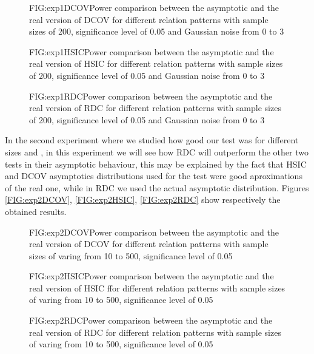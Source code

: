 \begin{figure}[Experiment 1 DCOV asymptotic vs real]{FIG:exp1DCOV}{Power comparison between the asymptotic and the real version of DCOV for different relation patterns with sample sizes of 200, significance level of 0.05 and Gaussian noise from 0 to 3}
\end{figure}
\begin{figure}[Experiment 1 HSIC asymptotic vs real]{FIG:exp1HSIC}{Power comparison between the asymptotic and the real version of HSIC for different relation patterns with sample sizes of 200, significance level of 0.05 and Gaussian noise from 0 to 3}
\end{figure}
\begin{figure}[Experiment 1 RDC asymptotic vs real]{FIG:exp1RDC}{Power comparison between the asymptotic and the real version of RDC for different relation patterns with sample sizes of 200, significance level of 0.05 and Gaussian noise from 0 to 3}
\end{figure}

In the second experiment where we studied how good our test was for different sizes and , in this experiment we will see how RDC will outperform the other two tests in their asymptotic behaviour, this may be explained by the fact that HSIC and DCOV asymptotics distributions used for the test were good aproximations of the real one, while in RDC we used the actual asymptotic distribution. Figures \ref{FIG:exp2DCOV}, \ref{FIG:exp2HSIC}, \ref{FIG:exp2RDC} show respectively the obtained results.
\begin{figure}[Experiment 2 DCOV asymptotic vs real]{FIG:exp2DCOV}{Power comparison between the asymptotic and the real version of DCOV for different relation patterns with sample sizes of varing from 10 to 500, significance level of 0.05}
\end{figure}
\begin{figure}[Experiment 2 HSIC asymptotic vs real]{FIG:exp2HSIC}{Power comparison between the asymptotic and the real version of HSIC ffor different relation patterns with sample sizes of varing from 10 to 500, significance level of 0.05}
\end{figure}
\begin{figure}[Experiment 2 RDC asymptotic vs real]{FIG:exp2RDC}{Power comparison between the asymptotic and the real version of RDC for different relation patterns with sample sizes of varing from 10 to 500, significance level of 0.05}
\end{figure}



